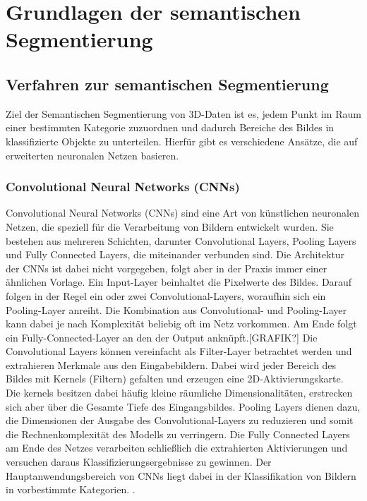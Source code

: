 \chapter{Grundlagen der semantischen Segmentierung}

\section{Verfahren zur semantischen Segmentierung}

Ziel der Semantischen Segmentierung von 3D-Daten ist es, jedem Punkt im Raum
einer bestimmten Kategorie zuzuordnen und dadurch Bereiche des Bildes in
klassifizierte Objekte zu unterteilen. Hierfür gibt es verschiedene Ansätze,
die auf erweiterten neuronalen Netzen basieren.

\subsection{Convolutional Neural Networks (CNNs)}
Convolutional Neural Networks (CNNs) sind eine Art von künstlichen neuronalen
Netzen, die speziell für die Verarbeitung von Bildern entwickelt wurden. Sie
bestehen aus mehreren Schichten, darunter Convolutional Layers, Pooling Layers
und Fully Connected Layers, die miteinander verbunden sind. Die Architektur der
CNNs ist dabei nicht vorgegeben, folgt aber in der Praxis immer einer ähnlichen
Vorlage. Ein Input-Layer beinhaltet die Pixelwerte des Bildes. Darauf folgen in
der Regel ein oder zwei Convolutional-Layers, woraufhin sich ein Pooling-Layer
anreiht. Die Kombination aus Convolutional- und Pooling-Layer kann dabei je
nach Komplexität beliebig oft im Netz vorkommen. Am Ende folgt ein
Fully-Connected-Layer an den der Output anknüpft.[GRAFIK?] Die Convolutional
Layers können vereinfacht als Filter-Layer betrachtet werden und extrahieren
Merkmale aus den Eingabebildern. Dabei wird jeder Bereich des Bildes mit
Kernels (Filtern) gefalten und erzeugen eine 2D-Aktivierungskarte. Die kernels
besitzen dabei häufig kleine räumliche Dimensionalitäten, erstrecken sich aber
über die Gesamte Tiefe des Eingangsbildes. Pooling Layers dienen dazu, die
Dimensionen der Ausgabe des Convolutional-Layers zu reduzieren und somit die
Rechnenkomplexität des Modells zu verringern. Die Fully Connected Layers am
Ende des Netzes verarbeiten schließlich die extrahierten Aktivierungen und
versuchen daraus Klassifizierungsergebnisse zu gewinnen. Der
Hauptanwendungsbereich von CNNs liegt dabei in der Klassifikation von Bildern
in vorbestimmte Kategorien. \cite{OShea.11262015}.

